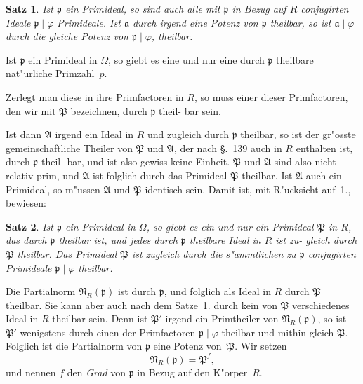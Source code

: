 \documentclass[12pt,a4paper]{article}
\theoremstyle{weber}
\newtheorem*{satz}{Satz}
\begin{document}
\begin{satz}
Ist $\mathfrak{p}$ ein Primideal, so sind auch alle mit $\mathfrak{p}$ in
Bezug auf $R$ conjugirten Ideale $\mathfrak{p} \mid \varphi$ Primideale.
Ist $\mathfrak{a}$ durch irgend eine Potenz von $\mathfrak{p}$ theilbar,
so ist $\mathfrak{a} \mid \varphi$ durch die gleiche Potenz von $\mathfrak{p} \mid \varphi$,
theilbar.
\end{satz}

Ist $\mathfrak{p}$ ein Primideal in $\varOmega$, so giebt es eine und nur eine
durch $\mathfrak{p}$ theilbare nat"urliche Primzahl~$p$.

Zerlegt man diese in ihre Primfactoren in $R$, so muss einer
dieser Primfactoren, den wir mit $\mathfrak{P}$ bezeichnen, durch $\mathfrak{p}$ theil-
bar sein.

Ist dann $\mathfrak{A}$ irgend ein Ideal in $R$ und zugleich durch $\mathfrak{p}$
theilbar, so ist der gr"osste gemeinschaftliche Theiler von $\mathfrak{P}$
und $\mathfrak{A}$, der nach \S.~139 auch in $R$ enthalten ist, durch $\mathfrak{p}$ theil-
bar, und ist also gewiss keine Einheit. $\mathfrak{P}$ und $\mathfrak{A}$ sind also nicht
relativ prim, und $\mathfrak{A}$ ist folglich durch das Primideal $\mathfrak{P}$ theilbar.
Ist $\mathfrak{A}$ auch ein Primideal, so m"ussen $\mathfrak{A}$ und $\mathfrak{P}$ identisch sein.
Damit ist, mit R"ucksicht auf~1., bewiesen:

\begin{satz}
Ist $\mathfrak{p}$ ein Primideal in $\varOmega$, so giebt es ein und nur
ein Primideal $\mathfrak{P}$ in $R$, das durch $\mathfrak{p}$ theilbar ist,
und jedes durch $\mathfrak{p}$ theilbare Ideal in $R$ ist zu-
gleich durch $\mathfrak{P}$ theilbar. Das Primideal $\mathfrak{P}$ ist
zugleich durch die s"ammtlichen zu $\mathfrak{p}$ conjugirten
Primideale $\mathfrak{p} \mid \varphi$ theilbar.
\end{satz}

Die Partialnorm $\mathfrak{N}_R(\mathfrak{p})$ ist durch $\mathfrak{p}$, und folglich als Ideal in
$R$ durch $\mathfrak{P}$ theilbar. Sie kann aber auch nach dem Satze~1.
durch kein von $\mathfrak{P}$ verschiedenes Ideal in $R$ theilbar sein. Denn
ist $\mathfrak{P}'$ irgend ein Primtheiler von $\mathfrak{N}_R(\mathfrak{p})$, so ist $\mathfrak{P}'$ wenigstens durch
einen der Primfactoren $\mathfrak{p} \mid \varphi$ theilbar und mithin gleich $\mathfrak{P}$. Folglich
ist die Partialnorm von $\mathfrak{p}$ eine Potenz von~$\mathfrak{P}$. Wir setzen
\begin{equation}\label{eq:s160-3}
\mathfrak{N}_R(\mathfrak{p}) = \mathfrak{P}^f,
\end{equation}
und nennen $f$ den \emph{Grad} von $\mathfrak{p}$ in Bezug auf den K"orper~$R$.
\end{document}
